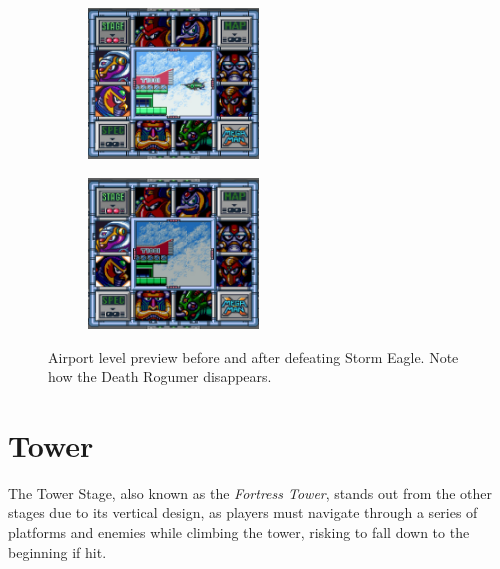\begin{figure}[htp]
	\centering
	\begin{subfigure}{0.4\linewidth}
		\centering
		\includegraphics[height=4cm]{figures/X1/Storm_eagle/Storm_prev_1.jpg}
		\caption{}
	\end{subfigure}
	\begin{subfigure}{0.4\linewidth}
		\centering
		\includegraphics[height=4cm]{figures/X1/Storm_eagle/Storm_prev_2.jpg}
		\caption{}
	\end{subfigure}
	\caption{Airport level preview before and after defeating Storm Eagle. Note how the Death Rogumer disappears.}
\end{figure}


\section{Tower}
The Tower Stage, also known as the \textit{Fortress Tower}, stands out from the other stages due to its vertical design, as players must navigate through a series of platforms and enemies while climbing the tower, risking to fall down to the beginning if hit.

